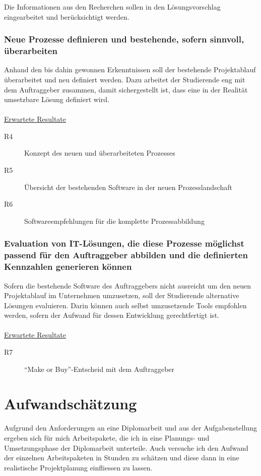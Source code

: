 Die Informationen aus den Recherchen sollen in den Lösungsvorschlag eingearbeitet
und berücksichtigt werden.

\subsubsection{Neue Prozesse definieren und bestehende, sofern sinnvoll, überarbeiten}
Anhand den bis dahin gewonnen Erkenntnissen soll der bestehende Projektablauf
überarbeitet und neu definiert werden. Dazu arbeitet der Studierende eng mit
dem Auftraggeber zusammen, damit sichergestellt ist, dass eine in der Realität
umsetzbare Lösung definiert wird.
\\\\
\underline{Erwartete Resultate}

\begin{description}
    \item[R4] Konzept des neuen und überarbeiteten Prozesses
    \item[R5] Übersicht der bestehenden Software in der neuen Prozesslandschaft
    \item[R6] Softwareempfehlungen für die komplette Prozessabbildung
\end{description}

\subsubsection{Evaluation von IT-Lösungen, die diese Prozesse möglichst passend 
    für den Auftraggeber abbilden und die definierten Kennzahlen generieren können}
Sofern die bestehende Software des Auftraggebers nicht ausreicht um den neuen
Projektablauf im Unternehmen umzusetzen, soll der Studierende alternative 
Lösungen evaluieren. Darin können auch selbst umzusetzende Tools empfohlen 
werden, sofern der Aufwand für dessen Entwicklung gerechtfertigt ist.
\\\\
\underline{Erwartete Resultate}

\begin{description}
    \item[R7] ``Make or Buy''-Entscheid mit dem Auftraggeber
\end{description}

\section{Aufwandschätzung}
Aufgrund den Anforderungen an eine Diplomarbeit und aus der Aufgabenstellung
ergeben sich für mich Arbeitspakete, die ich in eine Planungs- und Umsetzungsphase
der Diplomarbeit unterteile. Auch versuche ich den Aufwand der einzelnen
Arbeitspaketen in Stunden zu schätzen und diese dann in eine realistische 
Projektplanung einfliessen zu lassen.

